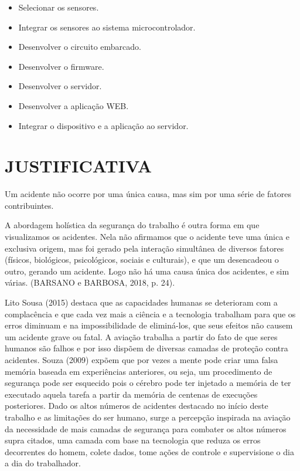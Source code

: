 \begin{itemize}
    \item   Selecionar os sensores.
    \item	Integrar os sensores ao sistema microcontrolador.
    \item	Desenvolver o circuito embarcado.
    \item	Desenvolver o firmware.
    \item	Desenvolver o servidor.
    \item	Desenvolver a aplicação WEB.
    \item	Integrar o dispositivo e a aplicação ao servidor.

\end{itemize}

\section{JUSTIFICATIVA}
\label{sec: justificativa}

Um acidente não ocorre por uma única causa, mas sim por uma série de fatores contribuintes.

\begin{citacao}
A abordagem holística da segurança do trabalho é outra forma em que visualizamos os acidentes. Nela não afirmamos que o acidente teve uma única e exclusiva origem, mas foi gerado pela interação simultânea de diversos fatores (físicos, biológicos, psicológicos, sociais e culturais), e que um desencadeou o outro, gerando um acidente. Logo não há uma causa única dos acidentes, e sim várias. (BARSANO e BARBOSA, 2018, p. 24). 
\end{citacao}

Lito Sousa (2015) destaca que as capacidades humanas se deterioram com a complacência e que cada vez mais a ciência e a tecnologia trabalham para que os erros diminuam e na impossibilidade de eliminá-los, que seus efeitos não causem um acidente grave ou fatal.
A aviação trabalha a partir do fato de que seres humanos são falhos e por isso dispõem de diversas camadas de proteção contra acidentes. Souza (2009) expõem que por vezes a mente pode criar uma falsa memória baseada em experiências anteriores, ou seja, um procedimento de segurança pode ser esquecido pois o cérebro pode ter injetado a memória de ter executado aquela tarefa a partir da memória de centenas de execuções posteriores.
Dado os altos números de acidentes destacado no início deste trabalho e as limitações do ser humano, surge a percepção inspirada na aviação da necessidade de mais camadas de segurança para combater os altos números supra citados, uma camada com base na tecnologia que reduza os erros decorrentes do homem, colete dados, tome ações de controle e supervisione o dia a dia do trabalhador. 

